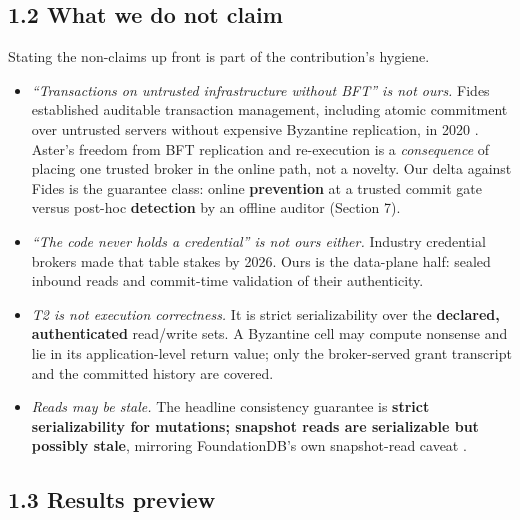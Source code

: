 \documentclass[
  11pt,
]{article}
\providecommand{\tightlist}{%
  \setlength{\itemsep}{0pt}\setlength{\parskip}{0pt}}
\begin{document}
\subsection{1.2 What we do not claim}\label{what-we-do-not-claim}

Stating the non-claims up front is part of the contribution's hygiene.

\begin{itemize}
\tightlist
\item
  \emph{``Transactions on untrusted infrastructure without BFT'' is not ours.} Fides established auditable transaction management, including atomic commitment over untrusted servers without expensive Byzantine replication, in 2020 \cite{fides2020}. Aster's freedom from BFT replication and re-execution is a \emph{consequence} of placing one trusted broker in the online path, not a novelty. Our delta against Fides is the guarantee class: online \textbf{prevention} at a trusted commit gate versus post-hoc \textbf{detection} by an offline auditor (Section 7).
\item
  \emph{``The code never holds a credential'' is not ours either.} Industry credential brokers made that table stakes by 2026. Ours is the data-plane half: sealed inbound reads and commit-time validation of their authenticity.
\item
  \emph{T2 is not execution correctness.} It is strict serializability over the \textbf{declared, authenticated} read/write sets. A Byzantine cell may compute nonsense and lie in its application-level return value; only the broker-served grant transcript and the committed history are covered.
\item
  \emph{Reads may be stale.} The headline consistency guarantee is \textbf{strict serializability for mutations; snapshot reads are serializable but possibly stale}, mirroring FoundationDB's own snapshot-read caveat \cite{fdb2021}.
\end{itemize}

\subsection{1.3 Results preview}\label{results-preview}
\end{document}
